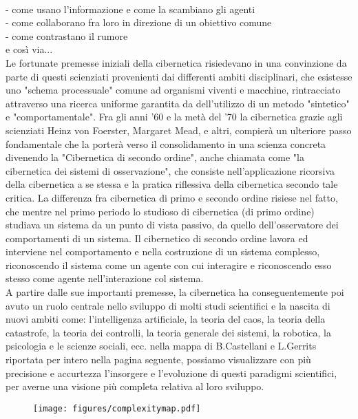 \clearpage

\\
- come usano l'informazione e come la scambiano gli agenti
\\
- come collaborano fra loro in direzione di un obiettivo comune
\\
- come contrastano il rumore
\\
e così via...
\\
Le fortunate premesse iniziali della cibernetica risiedevano in una convinzione
da parte di questi scienziati provenienti dai differenti ambiti disciplinari,
che esistesse uno
"schema processuale" comune ad organismi viventi e macchine,
rintracciato attraverso una ricerca uniforme garantita da dell'utilizzo di un metodo
"sintetico" e "comportamentale".
Fra gli anni '60 e la metà del '70 la cibernetica grazie agli scienziati
Heinz von Foerster, Margaret Mead, e altri,
compierà un ulteriore passo fondamentale che la porterà
verso il consolidamento in una scienza concreta
divenendo la "Cibernetica di secondo ordine",
anche chiamata come "la cibernetica dei sistemi di osservazione",
che consiste nell'applicazione
ricorsiva della cibernetica a se stessa e la pratica riflessiva della cibernetica
secondo tale critica.
La differenza fra cibernetica di primo e secondo ordine risiese nel fatto,
che mentre nel primo periodo lo studioso di cibernetica (di primo ordine)
studiava un sistema da un punto di vista passivo, da quello dell'osservatore
dei comportamenti di un sistema.
Il  cibernetico di secondo ordine lavora ed interviene nel comportamento
e nella costruzione di un sistema complesso,
riconoscendo il sistema come un agente con cui interagire e
riconoscendo esso stesso come agente nell'interazione col sistema.
\\
A partire dalle sue importanti premesse,
la cibernetica ha conseguentemente poi avuto un ruolo centrale nello sviluppo di
molti studi scientifici e la nascita
di nuovi ambiti come: l'intelligenza artificiale, la teoria del caos,
la teoria della catastrofe,
la teoria dei controlli, la teoria generale dei sistemi, la robotica,
la psicologia e le scienze sociali,
ecc.
nella mappa di B.Castellani e L.Gerrits riportata per intero nella pagina seguente,
possiamo visualizzare con più precisione e accurtezza
l'insorgere e l'evoluzione di questi paradigmi scientifici, per averne una
visione più completa relativa al loro sviluppo.

\clearpage

\begin{figure}[!h]
    \centering
    \texttt{[image: figures/complexitymap.pdf]}
    \label{fig:figure}
\end{figure}

